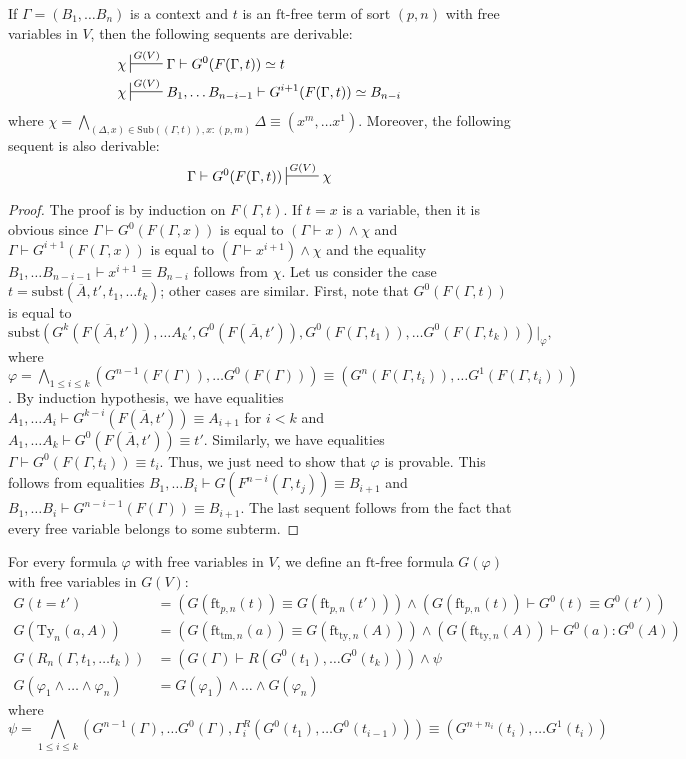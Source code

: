 \documentclass[reqno]{amsart}
\theoremstyle{definition}
\theoremstyle{remark}
\newcommand{\fs}[1]{\mathrm{#1}}
\newcommand{\subst}{\fs{subst}}
\newcommand{\ft}{\fs{ft}}
\newcommand{\ty}{\fs{ty}}
\newcommand{\Ty}{\fs{Ty}}
\newcommand{\tm}{\fs{tm}}
\newcommand{\sub}{\fs{Sub}}
\numberwithin{figure}{section}
\begin{document}
\begin{lem}
If $\Gamma = (B_1, \ldots B_n)$ is a context and $t$ is an $\ft$-free term of sort $(p,n)$ with free variables in $V$, then the following sequents are derivable:
\begin{align*}
\chi & \sststile{}{G(V)} \Gamma \vdash G^0(F(\Gamma,t)) \simeq t \\
\chi & \sststile{}{G(V)} B_1, \ldots B_{n-i-1} \vdash G^{i+1}(F(\Gamma,t)) \simeq B_{n-i}
\end{align*}
where $\chi = \bigwedge_{(\Delta,x) \in \sub((\Gamma,t)), x : (p,m)} \Delta \equiv (x^m, \ldots x^1)$.
Moreover, the following sequent is also derivable:
\[ \Gamma \vdash G^0(F(\Gamma,t)) \sststile{}{G(V)} \chi \]
\end{lem}
\begin{proof}
The proof is by induction on $F(\Gamma,t)$.
If $t = x$ is a variable, then it is obvious since $\Gamma \vdash G^0(F(\Gamma,x))$ is equal to $(\Gamma \vdash x) \land \chi$ and $\Gamma \vdash G^{i+1}(F(\Gamma,x))$ is equal to $(\Gamma \vdash x^{i+1}) \land \chi$ and the equality $B_1, \ldots B_{n-i-1} \vdash x^{i+1} \equiv B_{n-i}$ follows from $\chi$.
Let us consider the case $t = \subst(\overline{A}, t', t_1, \ldots t_k)$; other cases are similar.
First, note that $G^0(F(\Gamma,t))$ is equal to
\[ \subst(G^k(F(\overline{A},t')), \ldots A_k', G^0(F(\overline{A},t')), G^0(F(\Gamma,t_1)), \ldots G^0(F(\Gamma,t_k)))|_\varphi, \]
where $\varphi = \bigwedge_{1 \leq i \leq k} (G^{n-1}(F(\Gamma)), \ldots G^0(F(\Gamma))) \equiv (G^n(F(\Gamma,t_i)), \ldots G^1(F(\Gamma,t_i)))$.
By induction hypothesis, we have equalities $A_1, \ldots A_i \vdash G^{k-i}(F(\overline{A},t')) \equiv A_{i+1}$ for $i < k$ and $A_1, \ldots A_k \vdash G^0(F(\overline{A},t')) \equiv t'$.
Similarly, we have equalities $\Gamma \vdash G^0(F(\Gamma,t_i)) \equiv t_i$.
Thus, we just need to show that $\varphi$ is provable.
This follows from equalities $B_1, \ldots B_i \vdash G(F^{n-i}(\Gamma,t_j)) \equiv B_{i+1}$ and $B_1, \ldots B_i \vdash G^{n-i-1}(F(\Gamma)) \equiv B_{i+1}$.
The last sequent follows from the fact that every free variable belongs to some subterm.
\end{proof}

For every formula $\varphi$ with free variables in $V$, we define an $\ft$-free formula $G(\varphi)$ with free variables in $G(V)$:
\begin{align*}
G(t = t') & = (G(\ft_{p,n}(t)) \equiv G(\ft_{p,n}(t'))) \land (G(\ft_{p,n}(t)) \vdash G^0(t) \equiv G^0(t')) \\
G(\Ty_n(a,A)) & = (G(\ft_{\tm,n}(a)) \equiv G(\ft_{\ty,n}(A))) \land (G(\ft_{\ty,n}(A)) \vdash G^0(a) : G^0(A)) \\
G(R_n(\Gamma, t_1, \ldots t_k)) & = (G(\Gamma) \vdash R(G^0(t_1), \ldots G^0(t_k))) \land \psi \\
G(\varphi_1 \land \ldots \land \varphi_n) & = G(\varphi_1) \land \ldots \land G(\varphi_n)
\end{align*}
 where
 \[ \psi = \bigwedge_{1 \leq i \leq k} (G^{n-1}(\Gamma), \ldots G^0(\Gamma), \Gamma^R_i(G^0(t_1), \ldots G^0(t_{i-1}))) \equiv (G^{n+n_i}(t_i), \ldots G^1(t_i)) \]
\end{document}
